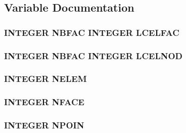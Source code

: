 \subsection{Variable Documentation}
\hypertarget{mesh_8com_a1c18571472b5302b3a8ee29ece24bc40}{
\subsubsection[{L\-C\-E\-L\-F\-A\-C}]{\setlength{\rightskip}{0pt plus 5cm}I\-N\-T\-E\-G\-E\-R N\-B\-F\-A\-C I\-N\-T\-E\-G\-E\-R L\-C\-E\-L\-F\-A\-C}}\label{mesh_8com_a1c18571472b5302b3a8ee29ece24bc40}
\hypertarget{mesh_8com_ad60bfbd45e7524439e47beda45c898ef}{
\subsubsection[{L\-C\-E\-L\-N\-O\-D}]{\setlength{\rightskip}{0pt plus 5cm}I\-N\-T\-E\-G\-E\-R N\-B\-F\-A\-C I\-N\-T\-E\-G\-E\-R L\-C\-E\-L\-N\-O\-D}}\label{mesh_8com_ad60bfbd45e7524439e47beda45c898ef}
\hypertarget{mesh_8com_aee5e75b79d0e815c0603cfbccc618957}{
\subsubsection[{N\-E\-L\-E\-M}]{\setlength{\rightskip}{0pt plus 5cm}I\-N\-T\-E\-G\-E\-R N\-E\-L\-E\-M}}\label{mesh_8com_aee5e75b79d0e815c0603cfbccc618957}
\hypertarget{mesh_8com_a78142d59d4cbb9fedbede16187658dd3}{
\subsubsection[{N\-F\-A\-C\-E}]{\setlength{\rightskip}{0pt plus 5cm}I\-N\-T\-E\-G\-E\-R N\-F\-A\-C\-E}}\label{mesh_8com_a78142d59d4cbb9fedbede16187658dd3}
\hypertarget{mesh_8com_ae28c1572321efcd8715b974d87d20c58}{
\subsubsection[{N\-P\-O\-I\-N}]{\setlength{\rightskip}{0pt plus 5cm}I\-N\-T\-E\-G\-E\-R N\-P\-O\-I\-N}}\label{mesh_8com_ae28c1572321efcd8715b974d87d20c58}
